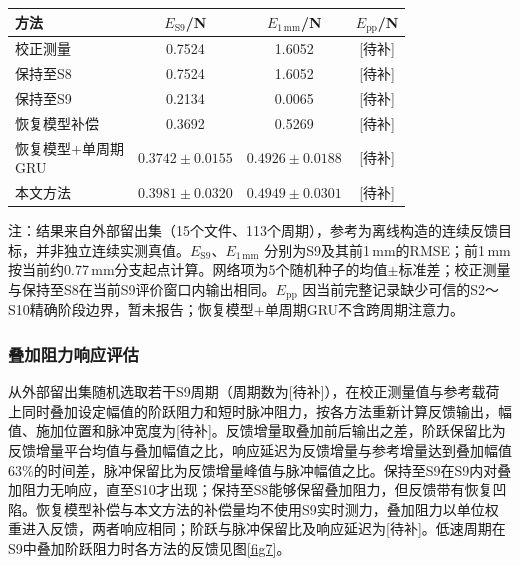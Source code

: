 \documentclass{JQR_LaTeX_Template-0507/JQRnew}
\providecommand{\RevisionColor}{\color{black}}
\newcommand{\revbegin}{\begingroup\RevisionColor}
\newcommand{\revend}{\par\endgroup}
\begin{document}
\revbegin
\begin{table}[H]
	\centering
	\label{tab1}
	\small
	\setlength{\tabcolsep}{2pt}
	\begin{tabular}{lccc}
		\toprule
		方法 & $E_{\mathrm{S9}}$/N & $E_{1\,\mathrm{mm}}$/N & $E_{\mathrm{pp}}$/N\\
		\midrule
		校正测量 & 0.7524 & 1.6052 & [待补]\\
		保持至S8 & 0.7524 & 1.6052 & [待补]\\
		保持至S9 & 0.2134 & 0.0065 & [待补]\\
		恢复模型补偿 & 0.3692 & 0.5269 & [待补]\\
		\makecell[l]{恢复模型+单周期\\GRU} & $0.3742\pm0.0155$ & $0.4926\pm0.0188$ & [待补]\\
		本文方法 & $0.3981\pm0.0320$ & $0.4949\pm0.0301$ & [待补]\\
		\bottomrule
	\end{tabular}
	\par\vspace{2pt}
		{\footnotesize 注：结果来自外部留出集（15个文件、113个周期），参考为离线构造的连续反馈目标，并非独立连续实测真值。$E_{\mathrm{S9}}$、$E_{1\,\mathrm{mm}}$ 分别为S9及其前1\,mm的RMSE；前1\,mm按当前约0.77\,mm分支起点计算。网络项为5个随机种子的均值$\pm$标准差；校正测量与保持至S8在当前S9评价窗口内输出相同。$E_{\mathrm{pp}}$ 因当前完整记录缺少可信的S2～S10精确阶段边界，暂未报告；恢复模型+单周期GRU不含跨周期注意力。}
\end{table}
\revend

\revbegin
\subsubsection{叠加阻力响应评估}
\revend

\revbegin
从外部留出集随机选取若干S9周期（周期数为[待补]），在校正测量值与参考载荷上同时叠加设定幅值的阶跃阻力和短时脉冲阻力，按各方法重新计算反馈输出，幅值、施加位置和脉冲宽度为[待补]。反馈增量取叠加前后输出之差，阶跃保留比为反馈增量平台均值与叠加幅值之比，响应延迟为反馈增量与参考增量达到叠加幅值63\%的时间差，脉冲保留比为反馈增量峰值与脉冲幅值之比。保持至S9在S9内对叠加阻力无响应，直至S10才出现；保持至S8能够保留叠加阻力，但反馈带有恢复凹陷。恢复模型补偿与本文方法的补偿量均不使用S9实时测力，叠加阻力以单位权重进入反馈，两者响应相同；阶跃与脉冲保留比及响应延迟为[待补]。低速周期在S9中叠加阶跃阻力时各方法的反馈见图\ref{fig7}。
\revend
\end{document}
